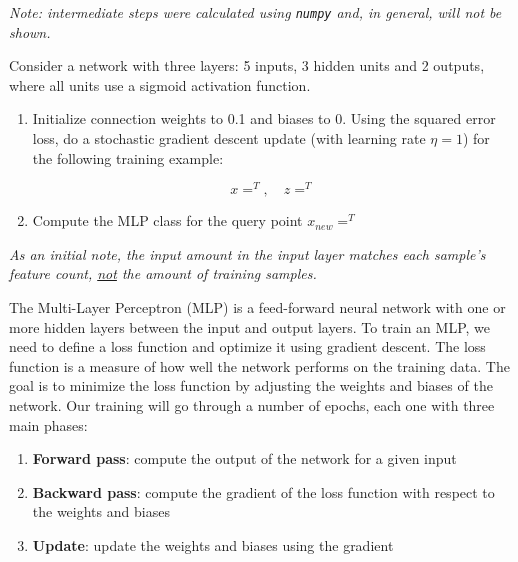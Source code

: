 \documentclass[12pt]{article}
\begin{document}
\textit{Note: intermediate steps were calculated using \texttt{numpy} and, in general, will not be shown.}

\begin{enumerate}[leftmargin=\labelsep]
  \begin{tcolorbox}[enhanced jigsaw,colback=bg,boxrule=0pt,arc=1pt,halign=center]
    \item Consider a network with three layers: 5 inputs, 3 hidden units and 2 outputs,
    where all units use a sigmoid activation function.

    \begin{enumerate}
      \item {Initialize connection weights to 0.1 and biases to 0. Using the squared
            error loss, do a stochastic gradient descent update (with learning rate $\eta = 1$)
            for the following training example:

            \begin{equation*}
              x = ^T, \quad z = ^T
            \end{equation*}} \label{ex-1-a}

      \item {Compute the MLP class for the query point $x_{new} = ^T$} \label{ex-1-b}
    \end{enumerate}
  \end{tcolorbox}

  \textit{As an initial note, the \textit{input amount} in the input layer matches each sample's
    feature count, \underline{not} the amount of training samples.}

  The Multi-Layer Perceptron (MLP) is a feed-forward neural network with one or more hidden layers
  between the input and output layers. To train an MLP, we need to define a loss function and
  optimize it using gradient descent. The loss function is a measure of how well the network
  performs on the training data. The goal is to minimize the loss function by adjusting the
  weights and biases of the network. Our training will go through a number of epochs, each
  one with three main phases:

  \begin{enumerate}
    \item \textbf{Forward pass}: compute the output of the network for a given input
    \item \textbf{Backward pass}: compute the gradient of the loss function with respect to the
          weights and biases
    \item \textbf{Update}: update the weights and biases using the gradient
  \end{enumerate}


\end{enumerate}
\end{document}

